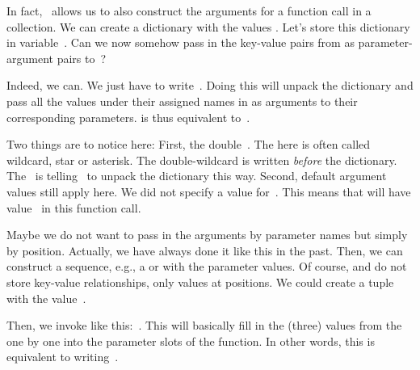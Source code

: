 %
In fact, \python\ allows us to also construct the arguments for a function call in a collection.
We can create a dictionary with the values .
Let's store this dictionary in variable~.
Can we now somehow pass in the key-value pairs from  as parameter-argument pairs to~?

Indeed, we can.
We just have to write~.
Doing this will unpack the dictionary  and pass all the values under their assigned names in as arguments to their corresponding parameters.
 is thus equivalent to~.

Two things are to notice here:
First, the double~\pythonil{*}.
The \pythonil{*} here is often called %
wildcard, %
star or %
asterisk. %
The double-wildcard \pythonil{**} is written \emph{before} the dictionary.
The~\pythonil{**} is telling \python\ to unpack the dictionary this way.
Second, default argument values still apply here.
We did not specify a value for~.
This means that  will have value~ in this function call.

Maybe we do not want to pass in the arguments by parameter names but simply by position.
Actually, we have always done it like this in the past.
Then, we can construct a sequence, e.g., a  or  with the parameter values.
Of course,  and  do not store key-value relationships, only values at positions.
We could create a tuple~ with the value~.

Then, we  invoke  like this:~.
This will basically fill in the (three) values from the  one by one into the parameter slots of the function.
In other words, this is equivalent to writing~.


